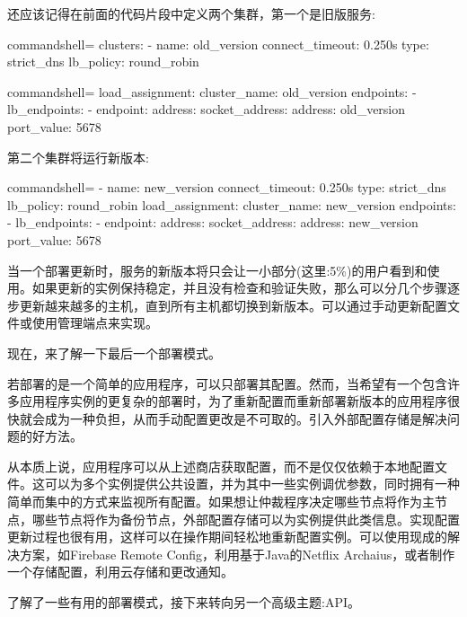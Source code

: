还应该记得在前面的代码片段中定义两个集群，第一个是旧版服务:

\begin{tcblisting}{commandshell={}}
clusters:
  - name: old_version
    connect_timeout: 0.250s
    type: strict_dns
    lb_policy: round_robin
\end{tcblisting}
\begin{tcblisting}{commandshell={}}
    load_assignment:
      cluster_name: old_version
      endpoints:
        - lb_endpoints:
          - endpoint:
            address:
              socket_address:
                address: old_version
                port_value: 5678

\end{tcblisting}

第二个集群将运行新版本:

\begin{tcblisting}{commandshell={}}
- name: new_version
  connect_timeout: 0.250s
  type: strict_dns
  lb_policy: round_robin
  load_assignment:
    cluster_name: new_version
    endpoints:
      - lb_endpoints:
        - endpoint:
            address:
              socket_address:
                address: new_version
                port_value: 5678
\end{tcblisting}

当一个部署更新时，服务的新版本将只会让一小部分(这里:5\%)的用户看到和使用。如果更新的实例保持稳定，并且没有检查和验证失败，那么可以分几个步骤逐步更新越来越多的主机，直到所有主机都切换到新版本。可以通过手动更新配置文件或使用管理端点来实现。

现在，来了解一下最后一个部署模式。


若部署的是一个简单的应用程序，可以只部署其配置。然而，当希望有一个包含许多应用程序实例的更复杂的部署时，为了重新配置而重新部署新版本的应用程序很快就会成为一种负担，从而手动配置更改是不可取的。引入外部配置存储是解决问题的好方法。

从本质上说，应用程序可以从上述商店获取配置，而不是仅仅依赖于本地配置文件。这可以为多个实例提供公共设置，并为其中一些实例调优参数，同时拥有一种简单而集中的方式来监视所有配置。如果想让仲裁程序决定哪些节点将作为主节点，哪些节点将作为备份节点，外部配置存储可以为实例提供此类信息。实现配置更新过程也很有用，这样可以在操作期间轻松地重新配置实例。可以使用现成的解决方案，如Firebase Remote Config，利用基于Java的Netflix Archaius，或者制作一个存储配置，利用云存储和更改通知。

了解了一些有用的部署模式，接下来转向另一个高级主题:API。



























